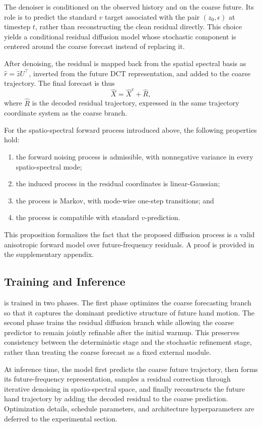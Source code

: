 The denoiser is conditioned on the observed history and on the coarse future. Its role is to predict the standard $v$ target associated with the pair $(z_0,\epsilon)$ at timestep $t$, rather than reconstructing the clean residual directly. This choice yields a conditional residual diffusion model whose stochastic component is centered around the coarse forecast instead of replacing it.

After denoising, the residual is mapped back from the spatial spectral basis as $\hat{r}=\hat{z}U^\top$, inverted from the future DCT representation, and added to the coarse trajectory. The final forecast is thus
\[
\hat{X} = \hat{X}^{c} + \hat{R},
\]
where $\hat{R}$ is the decoded residual trajectory, expressed in the same trajectory coordinate system as the coarse branch.

\begin{proposition}
\label{prop:ss_validity}
For the spatio-spectral forward process introduced above, the following properties hold:
\begin{enumerate}
    \item the forward noising process is admissible, with nonnegative variance in every spatio-spectral mode;
    \item the induced process in the residual coordinates is linear-Gaussian;
    \item the process is Markov, with mode-wise one-step transitions; and
    \item the process is compatible with standard $v$-prediction.
\end{enumerate}
\end{proposition}

This proposition formalizes the fact that the proposed diffusion process is a valid anisotropic forward model over future-frequency residuals. A proof is provided in the supplementary appendix.

\subsection{Training and Inference}
\label{sec:method_training}

\modelname{} is trained in two phases. The first phase optimizes the coarse forecasting branch so that it captures the dominant predictive structure of future hand motion. The second phase trains the residual diffusion branch while allowing the coarse predictor to remain jointly refinable after the initial warmup. This preserves consistency between the deterministic stage and the stochastic refinement stage, rather than treating the coarse forecast as a fixed external module.

At inference time, the model first predicts the coarse future trajectory, then forms its future-frequency representation, samples a residual correction through iterative denoising in spatio-spectral space, and finally reconstructs the future hand trajectory by adding the decoded residual to the coarse prediction. Optimization details, schedule parameters, and architecture hyperparameters are deferred to the experimental section.
